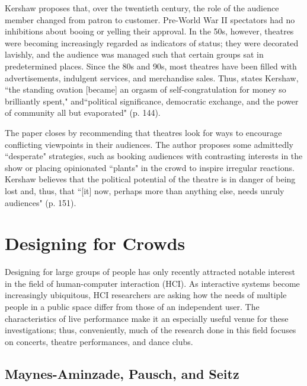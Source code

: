 Kershaw proposes that, over the twentieth century, the role of the audience member changed from patron to customer. Pre-World War II spectators had no inhibitions about booing or yelling their approval. In the 50s, however, theatres were becoming increasingly regarded as indicators of status; they were decorated lavishly, and the audience was managed such that certain groups sat in predetermined places. Since the 80s and 90s, most theatres have been filled with advertisements, indulgent services, and merchandise sales. Thus, states Kershaw, ``the standing ovation [became] an orgasm of self-congratulation for money so brilliantly spent," and``political significance, democratic exchange, and the power of community all but evaporated" (p. 144).

The paper closes by recommending that theatres look for ways to encourage conflicting viewpoints in their audiences. The author proposes some admittedly ``desperate" strategies, such as booking audiences with contrasting interests in the show or placing opinionated ``plants" in the crowd to inspire irregular reactions. Kershaw believes that the political potential of the theatre is in danger of being lost and, thus, that ``[it] now, perhaps more than anything else, needs unruly audiences" (p. 151).


\section{Designing for Crowds}

Designing for large groups of people has only recently attracted notable interest in the field of human-computer interaction (HCI). As interactive systems become increasingly ubiquitous, HCI researchers are asking how the needs of multiple people in a public space differ from those of an independent user. The characteristics of live performance make it an especially useful venue for these investigations; thus, conveniently, much of the research done in this field focuses on concerts, theatre performances, and dance clubs.

\subsection{Maynes-Aminzade, Pausch, and Seitz}

